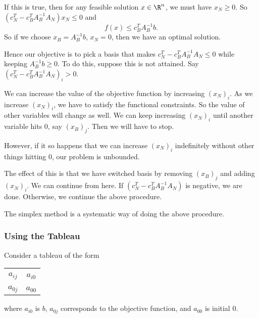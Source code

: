 \documentclass[a4paper]{article}
\begin{document}
If this is true, then for any feasible solution $x\in \R^n$, we must have $x_N \geq 0$. So $(c_N^T - c_B^TA_B^{-1}A_N)x_N \leq 0$ and
\[
  f(x) \leq c_B^T A_B^{-1}b.
\]
So if we choose $x_B = A_B^{-1}b$, $x_N = 0$, then we have an optimal solution.

Hence our objective is to pick a basis that makes $c_N^T - c_B^T A_B^{-1}A_N \leq 0$ while keeping $A_B^{-1}b \geq 0$. To do this, suppose this is not attained. Say $(c_N^T - c_B^T A_B^{-1}A_N)_i > 0$.

We can increase the value of the objective function by increasing $(x_N)_i$. As we increase $(x_N)_i$, we have to satisfy the functional constraints. So the value of other variables will change as well. We can keep increasing $(x_N)_i$ until another variable hits $0$, say $(x_B)_j$. Then we will have to stop.

However, if it so happens that we can increase $(x_N)_i$ indefinitely without other things hitting $0$, our problem is unbounded.

The effect of this is that we have switched basis by removing $(x_B)_j$ and adding $(x_N)_i$. We can continue from here. If $(c_N^T - c_B^T A_B^{-1}A_N)$ is negative, we are done. Otherwise, we continue the above procedure.

The simplex method is a systematic way of doing the above procedure.

\subsubsection{Using the Tableau}
Consider a tableau of the form
\begin{center}
\begin{tabular}{cc}
  \toprule\\
  \quad\quad $a_{ij}$\quad\quad\quad & $a_{i0}$\\\\
  \midrule
  \quad\quad $a_{0j}$\quad\quad\quad & $a_{00}$\\
  \bottomrule
\end{tabular}
\end{center}
where $a_{i0}$ is $b$, $a_{0j}$ corresponds to the objective function, and $a_{00}$ is initial $0$.
\end{document}
